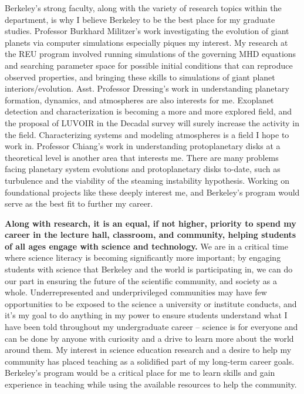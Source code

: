 \documentclass[11pt,letterpaper]{article}
\begin{document}
Berkeley's strong faculty, along with the variety of research topics within the department, is why I believe Berkeley to be the best place for my graduate studies. Professor Burkhard Militzer's work investigating the evolution of giant planets via computer simulations especially piques my interest. My research at the REU program involved running simulations of the governing MHD equations and searching parameter space for possible initial conditions that can reproduce observed properties, and bringing these skills to simulations of giant planet interiors/evolution. Asst. Professor Dressing's work in understanding planetary formation, dynamics, and atmospheres are also interests for me. Exoplanet detection and characterization is becoming a more and more explored field, and the proposal of LUVOIR in the Decadal survey will surely increase the activity in the field. Characterizing systems and modeling atmospheres is a field I hope to work in. Professor Chiang's work in understanding protoplanetary disks at a theoretical level is another area that interests me. There are many problems facing planetary system evolutions and protoplanetary disks to-date, such as turbulence and the viability of the steaming instability hypothesis. Working on foundational projects like these deeply interest me, and Berkeley's program would serve as the best fit to further my career.

\textbf{Along with research, it is an equal, if not higher, priority to spend my career in the lecture hall, classroom, and community, helping students of all ages engage with science and technology.} We are in a critical time where science literacy is becoming significantly more important; by engaging students with science that Berkeley and the world is participating in, we can do our part in ensuring the future of the scientific community, and society as a whole. Underrepresented and underprivileged communities may have few opportunities to be exposed to the science a university or institute conducts, and it’s my goal to do anything in my power to ensure students understand what I have been told throughout my undergraduate career -- science is for everyone and can be done by anyone with curiosity and a drive to learn more about the world around them. My interest in science education research and a desire to help my community has placed teaching as a solidified part of my long-term career goals. Berkeley's program would be a critical place for me to learn skills and gain experience in teaching while using the available resources to help the community.
\end{document}
